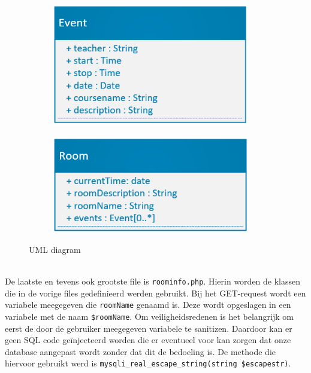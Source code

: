 \documentclass[a4paper,kul]{kulakarticle} %
\begin{document}
\begin{figure}[h]
	\centering
	\begin{subfigure}{0.45\textwidth}
		\centering
		\includegraphics[width=0.95\textwidth]{EventUML.png}
	\end{subfigure}
	\begin{subfigure}{0.45\textwidth}
		\centering
		\includegraphics[width=0.95\textwidth]{RoomUML.png}
	\end{subfigure}
	\caption{UML diagram}
	\label{fig:uml}
\end{figure} \\
De laatste en tevens ook grootste file is \verb|roominfo.php|. Hierin worden de klassen die in de vorige files gedefinieerd werden gebruikt. Bij het GET-request wordt een variabele meegegeven die \verb|roomName| genaamd is. Deze wordt opgeslagen in een variabele met de naam \verb|$roomName|. Om veiligheidsredenen is het belangrijk om eerst de door de gebruiker meegegeven variabele te sanitizen. Daardoor kan er geen SQL code geïnjecteerd worden die er eventueel voor kan zorgen dat onze database aangepast wordt zonder dat dit de bedoeling is. De methode die hiervoor gebruikt werd is \verb|mysqli_real_escape_string(string $escapestr)|.
\end{document}
